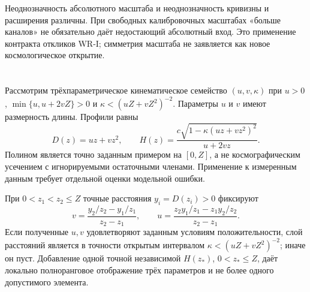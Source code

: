 {Неоднозначность абсолютного масштаба и неоднозначность кривизны и расширения различны. При свободных калибровочных масштабах «больше каналов» не обязательно даёт недостающий абсолютный вход. Это применение контракта откликов WR-I; симметрия масштаба не заявляется как новое космологическое открытие.}

\section{}\label{sec:finite}
{Рассмотрим трёхпараметрическое кинематическое семейство $(u,v,\kappa)$ при $u>0$, $\min\{u,u+2vZ\}>0$ и $\kappa<(uZ+vZ^2)^{-2}$. Параметры $u$ и $v$ имеют размерность длины. Профили равны}
\begin{equation}\label{eq:polynomial}
 D(z)=uz+vz^2,\qquad
 H(z)=\frac{c\sqrt{1-\kappa(uz+vz^2)^2}}{u+2vz}.
\end{equation}
{Полином является точно заданным примером на $[0,Z]$, а не космографическим усечением с игнорируемыми остаточными членами. Применение к измеренным данным требует отдельной оценки модельной ошибки.}
\begin{theorem}\label{thm:finite}
{При $0<z_1<z_2\leq Z$ точные расстояния $y_i=D(z_i)>0$ фиксируют}
\begin{equation}\label{eq:inversion}
 v=\frac{y_2/z_2-y_1/z_1}{z_2-z_1},\qquad
 u=\frac{z_2y_1/z_1-z_1y_2/z_2}{z_2-z_1}.
\end{equation}
{Если полученные $u,v$ удовлетворяют заданным условиям положительности, слой расстояний является в точности открытым интервалом $\kappa<(uZ+vZ^2)^{-2}$; иначе он пуст. Добавление одной точной независимой $H(z_*)$, $0<z_*\leq Z$, даёт локально полноранговое отображение трёх параметров и не более одного допустимого элемента.}
\end{theorem}
